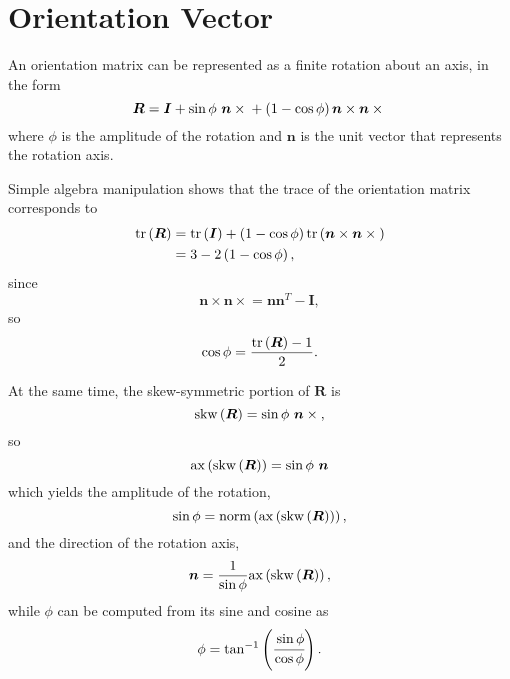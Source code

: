 \documentclass[10pt,fleqn,subeqn]{report}
\newcommand{\T}[1]{\bm{#1}}
\begin{document}
\section{Orientation Vector}
An orientation matrix can be represented as a finite rotation about 
an axis, in the form
\begin{equation}
	\T{R} = \T{I}
	+ \sin\phi \ \T{n}\times{}
	+ \plbr{1 - \cos\phi} \T{n}\times\T{n}\times{}
\end{equation}
where $\phi$ is the amplitude of the rotation and $\T{n}$ 
is the unit vector that represents the rotation axis.

Simple algebra manipulation shows that the trace of the orientation matrix
corresponds to 
\begin{align}
	\mathrm{tr}\plbr{\T{R}}
	&= \mathrm{tr}\plbr{\T{I}}
	+ \plbr{1 - \cos\phi}\mathrm{tr}\plbr{\T{n}\times\T{n}\times{}} \\
	&= 3 - 2 \plbr{1 - \cos\phi} ,
\end{align}
since
\begin{equation}
	\T{n}\times\T{n}\times{} = \T{n} \T{n}^T - \T{I} ,
\end{equation}
so
\begin{equation}
	\cos\phi = \frac{\mathrm{tr}\plbr{\T{R}} - 1}{2} .
\end{equation}

At the same time, the skew-symmetric portion of $\T{R}$ is
\begin{equation}
	\mathrm{skw}\plbr{\T{R}} = \sin\phi \ \T{n}\times{} ,
\end{equation}
so
\begin{equation}
	\mathrm{ax}\plbr{\mathrm{skw}\plbr{\T{R}}} = \sin\phi \ \T{n}
\end{equation}
which yields the amplitude of the rotation,
\begin{equation}
	\sin\phi
	= \mathrm{norm}\plbr{\mathrm{ax}\plbr{\mathrm{skw}\plbr{\T{R}}}} ,
\end{equation}
and the direction of the rotation axis,
\begin{equation}
	\T{n} = \frac{1}{\sin\phi}\mathrm{ax}\plbr{\mathrm{skw}\plbr{\T{R}}} ,
\end{equation}
while $\phi$ can be computed from its sine and cosine as
\begin{equation}
	\phi = \tan^{-1}\left( \cfrac{\sin\phi}{\cos\phi} \right) .
\end{equation}
\end{document}
